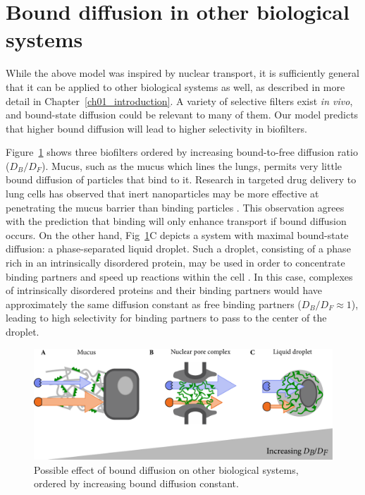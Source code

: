 \section{Bound diffusion in other biological systems}
\label{sec:other-filters}

While the above model was inspired by nuclear transport, it is sufficiently general that it can be applied to other biological systems as well, as described in more detail in Chapter~\ref{ch01_introduction}.  A variety of selective filters exist \textit{in vivo}, and bound-state diffusion could be relevant to many of them.  Our model predicts that higher bound diffusion will lead to higher selectivity in biofilters.  

Figure~\ref{fig:other-filters} shows three biofilters ordered by increasing bound-to-free diffusion ratio ($D_B/D_F$).  Mucus, such as the mucus which lines the lungs, permits very little bound diffusion of particles that bind to it.  Research in targeted drug delivery to lung cells has observed that inert nanoparticles may be more effective at penetrating the mucus barrier than binding particles \cite{witten17}.  This observation agrees with the prediction that binding will only enhance transport if bound diffusion occurs.   On the other hand, Fig~\ref{fig:other-filters}C depicts a system with maximal bound-state diffusion: a phase-separated liquid droplet.  Such a droplet, consisting of a phase rich in an intrinsically disordered protein, may be used in order to concentrate binding partners and speed up reactions within the cell \cite{brangwynne15, feric16}.  In this case, complexes of intrinsically disordered proteins and their binding partners would have approximately the same diffusion constant as free binding partners ($D_B/D_F \approx 1$), leading to high selectivity for binding partners to pass to the center of the droplet.

\begin{figure}
\centering
\includegraphics[width=0.8\linewidth]{figs/ch02/concluding-cartoon-large.pdf}
\caption[Bound diffusion in other systems.]{Possible effect of bound diffusion on other biological systems, ordered by increasing bound diffusion constant.}
\label{fig:other-filters}
\end{figure}

